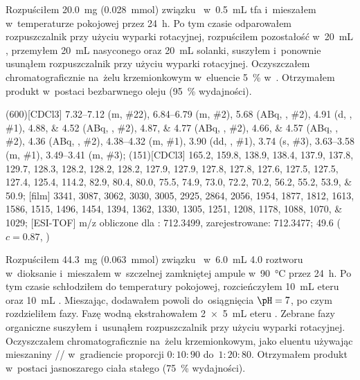 Rozpuściłem \SI{20.0}{\milli\gram} (\SI{0.028}{\milli\mol}) związku~
	w~\SI{0.5}{\milli\liter} \gls{tfa} i~mieszałem w~temperaturze pokojowej przez \SI{24}{\hour}.
Po tym czasie odparowałem rozpuszczalnik przy użyciu wyparki rotacyjnej,
	rozpuściłem pozostałość w~\SI{20}{\milli\liter} ,
	przemyłem \SI{20}{\milli\liter} nasyconego  oraz \SI{20}{\milli\liter} solanki,
	suszyłem  i~ponownie usunąłem rozpuszczalnik przy użyciu wyparki rotacyjnej.
Oczyszczałem chromatograficznie na~żelu krzemionkowym w~eluencie \SI{5}{\percent}  w~.
Otrzymałem produkt w~postaci bezbarwnego oleju (\SI{95}{\percent} wydajności).

\begin{fullexp}
	\NMR(600)[CDCl3] \numrange{7.32}{7.12} (m, \#{22}), \numrange{6.84}{6.79} (m, \#{2}), \num{5.68} (ABq, , \#{2}), \num{4.91} (d, , \#{1}), \numlist{4.88;4.52} (ABq, , \#{2}), \numlist{4.87;4.77} (ABq, , \#{2}), \numlist{4.66;4.57} (ABq, , \#{2}), \num{4.36} (ABq, , \#{2}), \numrange{4.38}{4.32} (m, \#{1}), \num{3.90} (dd, , \#{1}), \num{3.74} (s, \#{3}), \numrange{3.63}{3.58} (m, \#{1}), \numrange{3.49}{3.41} (m, \#{3});
	(151)[CDCl3] \numlist{165.2; 159.8; 138.9; 138.4; 137.9; 137.8; 129.7; 128.3; 128.2; 128.2; 128.2; 127.9; 127.9; 127.8; 127.8; 127.6; 127.5; 127.5; 127.4; 125.4; 114.2; 82.9; 80.4; 80.0; 75.5; 74.9; 73.0; 72.2; 70.2; 56.2; 55.2; 53.9; 50.9};
	[film] \numlist{3341; 3087; 3062; 3030; 3005; 2925; 2864; 2056; 1954; 1877; 1812; 1613; 1586; 1515; 1496; 1454; 1394; 1362; 1330; 1305; 1251; 1208; 1178; 1088; 1070; 1029};
	[ESI-TOF] m/z obliczone dla : \num{712.3499}, zarejestrowane: \num{712.3477};
	\data{[$\alpha^{23}_D$]~$=$} \num{49.6} ($c = 0.87$, )
\end{fullexp}

Rozpuściłem \SI{44.3}{\milli\gram} (\SI{0.063}{\milli\mol}) związku~
	w~\SI{6.0}{\milli\liter} \SI{4.0}{\Molar} roztworu  w~dioksanie i~mieszałem
	w~szczelnej zamkniętej ampule w~\SI{90}{\degreeCelsius} przez \SI{24}{\hour}.
Po tym czasie schłodziłem do temperatury pokojowej, rozcieńczyłem \SI{10}{\milli\liter}
	eteru  oraz \SI{10}{\milli\liter} .
Mieszając, dodawałem powoli  do~osiągnięcia $\pH = 7$, po czym rozdzieliłem fazy.
Fazę wodną ekstrahowałem \SI[product-units = single]{2 x 5}{\mL} eteru .
Zebrane fazy organiczne suszyłem  i~usunąłem rozpuszczalnik przy użyciu wyparki rotacyjnej.
Oczyszczałem chromatograficznie na~żelu krzemionkowym, jako eluentu używając mieszaniny
	// w~gradiencie proporcji $0:10:90$ do~$1:20:80$.
Otrzymałem produkt w~postaci jasnoszarego ciała stałego (\SI{75}{\percent} wydajności).

